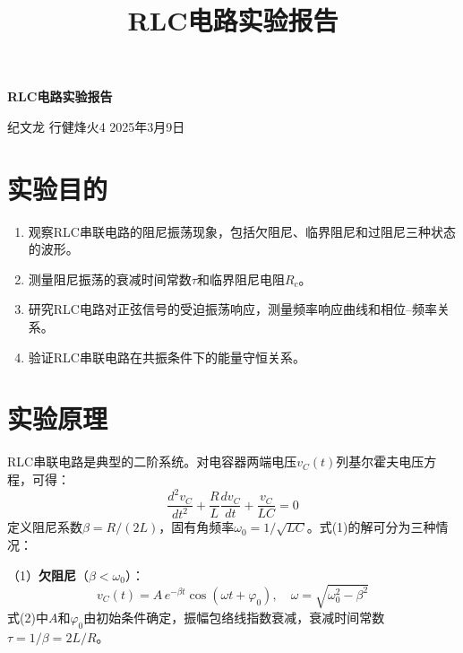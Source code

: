 \documentclass[12pt, a4paper]{article}
\title{\textbf{RLC电路实验报告}}
\author{}
\date{}
\begin{document}
\begin{center}
{\LARGE \textbf{RLC电路实验报告}}
\end{center}

\begin{flushright}
纪文龙 \quad 行健烽火4  \quad 2025年3月9日
\end{flushright}

\vspace{0.5cm}

\section*{实验目的}

\begin{enumerate}[label=\arabic*、]
    \item 观察RLC串联电路的阻尼振荡现象，包括欠阻尼、临界阻尼和过阻尼三种状态的波形。
    \item 测量阻尼振荡的衰减时间常数$\tau$和临界阻尼电阻$R_c$。
    \item 研究RLC电路对正弦信号的受迫振荡响应，测量频率响应曲线和相位--频率关系。
    \item 验证RLC串联电路在共振条件下的能量守恒关系。
\end{enumerate}

\section*{实验原理}


RLC串联电路是典型的二阶系统。对电容器两端电压$v_C(t)$列基尔霍夫电压方程，可得：
\begin{equation}
    \frac{d^2 v_C}{dt^2} + \frac{R}{L}\frac{dv_C}{dt} + \frac{v_C}{LC} = 0
\end{equation}
定义阻尼系数$\beta = R/(2L)$，固有角频率$\omega_0 = 1/\sqrt{LC}$。式(1)的解可分为三种情况：

（1）\textbf{欠阻尼}（$\beta < \omega_0$）：
\begin{equation}
    v_C(t) = A\,e^{-\beta t}\cos(\omega t + \varphi_0), \quad \omega = \sqrt{\omega_0^2 - \beta^2}
\end{equation}
式(2)中$A$和$\varphi_0$由初始条件确定，振幅包络线指数衰减，衰减时间常数$\tau = 1/\beta = 2L/R$。
\end{document}
